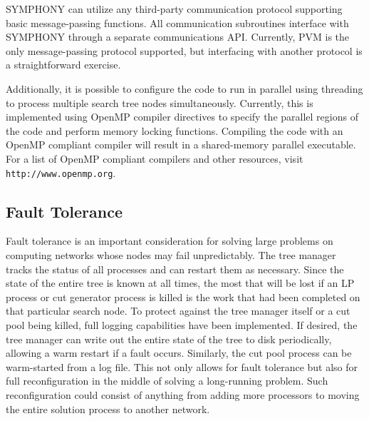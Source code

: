 SYMPHONY can utilize any third-party communication protocol supporting basic
message-passing functions. All communication subroutines interface with
SYMPHONY through a separate communications API. Currently, PVM \cite{PVMbook}
is the only message-passing protocol supported, but interfacing with another
protocol is a straightforward exercise.

Additionally, it is possible to configure the code to run in parallel
using threading to process multiple search tree nodes simultaneously.
Currently, this is implemented using OpenMP compiler directives to
specify the parallel regions of the code and perform memory locking
functions. Compiling the code with an OpenMP compliant compiler will
result in a shared-memory parallel executable. For a list of OpenMP
compliant compilers and other resources, visit {\tt http://www.openmp.org}.

\subsection{Fault Tolerance}
\label{fault-tolerance} 

Fault tolerance is an important consideration for solving large
problems on computing networks whose nodes may fail unpredictably. The
tree manager tracks the status of all processes and can restart them
as necessary. Since the state of the entire tree is known at all
times, the most that will be lost if an LP process or cut generator
process is killed is the work that had been completed on that
particular search node. To protect against the tree manager itself or
a cut pool being killed, full logging capabilities have been
implemented. If desired, the tree manager can write out the entire
state of the tree to disk periodically, allowing a warm restart if a
fault occurs. Similarly, the cut pool process can be warm-started from
a log file. This not only allows for fault tolerance but also for full
reconfiguration in the middle of solving a long-running problem. Such
reconfiguration could consist of anything from adding more processors
to moving the entire solution process to another network.

